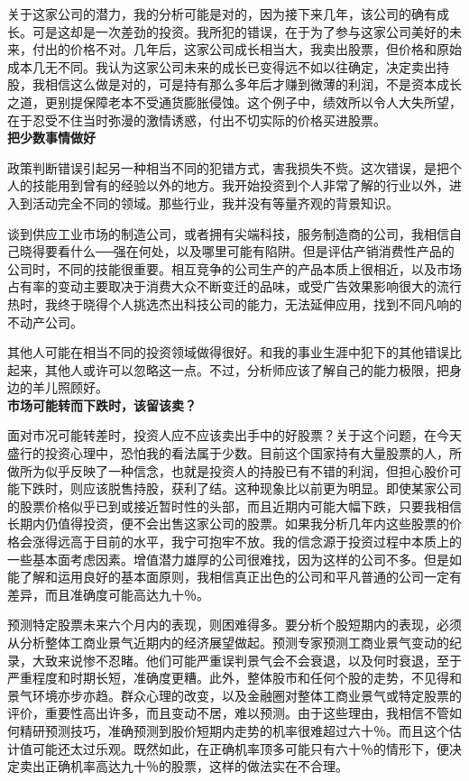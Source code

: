 \documentclass[UTF8,a4paper,zihao=-4,fontset = windows]{ctexart} %
\begin{document}
关于这家公司的潜力，我的分析可能是对的，因为接下来几年，该公司的确有成长。可是这却是一次差劲的投资。我所犯的错误，在于为了参与这家公司美好的未来，付出的价格不对。几年后，这家公司成长相当大，我卖出股票，但价格和原始成本几无不同。我认为这家公司未来的成长已变得远不如以往确定，决定卖出持股，我相信这么做是对的，可是持有那么多年后才赚到微薄的利润，不是资本成长之道，更别提保障老本不受通货膨胀侵蚀。这个例子中，绩效所以令人大失所望，在于忍受不住当时弥漫的激情诱惑，付出不切实际的价格买进股票。
\\

\textbf{把少数事情做好}


政策判断错误引起另一种相当不同的犯错方式，害我损失不赀。这次错误，是把个人的技能用到曾有的经验以外的地方。我开始投资到个人非常了解的行业以外，进入到活动完全不同的领域。那些行业，我并没有等量齐观的背景知识。

谈到供应工业市场的制造公司，或者拥有尖端科技，服务制造商的公司，我相信自己晓得要看什么──强在何处，以及哪里可能有陷阱。但是评估产销消费性产品的公司时，不同的技能很重要。相互竞争的公司生产的产品本质上很相近，以及市场占有率的变动主要取决于消费大众不断变迁的品味，或受广告效果影响很大的流行热时，我终于晓得个人挑选杰出科技公司的能力，无法延伸应用，找到不同凡响的不动产公司。

其他人可能在相当不同的投资领域做得很好。和我的事业生涯中犯下的其他错误比起来，其他人或许可以忽略这一点。不过，分析师应该了解自己的能力极限，把身边的羊儿照顾好。
\\

\textbf{市场可能转而下跌时，该留该卖？}


面对市况可能转差时，投资人应不应该卖出手中的好股票？关于这个问题，在今天盛行的投资心理中，恐怕我的看法属于少数。目前这个国家持有大量股票的人，所做所为似乎反映了一种信念，也就是投资人的持股已有不错的利润，但担心股价可能下跌时，则应该脱售持股，获利了结。这种现象比以前更为明显。即使某家公司的股票价格似乎已到或接近暂时性的头部，而且近期内可能大幅下跌，只要我相信长期内仍值得投资，便不会出售这家公司的股票。如果我分析几年内这些股票的价格会涨得远高于目前的水平，我宁可抱牢不放。我的信念源于投资过程中本质上的一些基本面考虑因素。增值潜力雄厚的公司很难找，因为这样的公司不多。但是如能了解和运用良好的基本面原则，我相信真正出色的公司和平凡普通的公司一定有差异，而且准确度可能高达九十％。

预测特定股票未来六个月内的表现，则困难得多。要分析个股短期内的表现，必须从分析整体工商业景气近期内的经济展望做起。预测专家预测工商业景气变动的纪录，大致来说惨不忍睹。他们可能严重误判景气会不会衰退，以及何时衰退，至于严重程度和时期长短，准确度更糟。此外，整体股市和任何个股的走势，不见得和景气环境亦步亦趋。群众心理的改变，以及金融圈对整体工商业景气或特定股票的评价，重要性高出许多，而且变动不居，难以预测。由于这些理由，我相信不管如何精研预测技巧，准确预测到股价短期内走势的机率很难超过六十％。而且这个估计值可能还太过乐观。既然如此，在正确机率顶多可能只有六十％的情形下，便决定卖出正确机率高达九十％的股票，这样的做法实在不合理。
\end{document}
